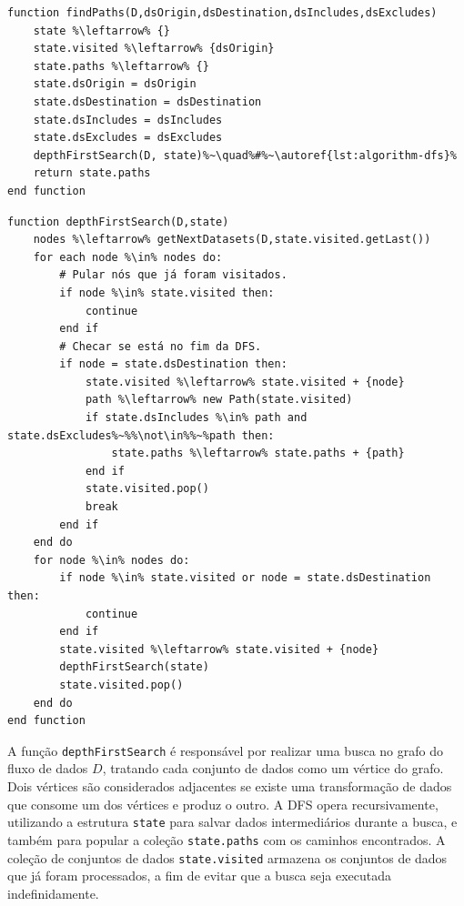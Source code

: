 \begin{minipage}[c]{0.95\textwidth}
\begin{lstlisting}[language=pseudocode,label={lst:algorithm-find-paths},caption={[Obtenção dos caminhos entre dois conjuntos de dados.]Obtenção de todos os caminhos entre dois conjuntos de dados, inicializando a \textsc{DFS} com um estado inicial apropriado.}]
function findPaths(D,dsOrigin,dsDestination,dsIncludes,dsExcludes)
    state %\leftarrow% {}
    state.visited %\leftarrow% {dsOrigin}
    state.paths %\leftarrow% {}
    state.dsOrigin = dsOrigin
    state.dsDestination = dsDestination
    state.dsIncludes = dsIncludes
    state.dsExcludes = dsExcludes
    depthFirstSearch(D, state)%~\quad%#%~\autoref{lst:algorithm-dfs}%
    return state.paths
end function
\end{lstlisting}
\end{minipage}

\begin{minipage}[c]{0.95\textwidth}
\begin{lstlisting}[language=pseudocode,label={lst:algorithm-dfs},caption={[Busca em Profundidade (DFS) dos caminhos]Depth First Search (DFS): busca em profundidade de todos os caminhos entre dois conjuntos de dados.}]
function depthFirstSearch(D,state)
    nodes %\leftarrow% getNextDatasets(D,state.visited.getLast())
    for each node %\in% nodes do:
        # Pular nós que já foram visitados.
        if node %\in% state.visited then:
            continue
        end if
        # Checar se está no fim da DFS.
        if node = state.dsDestination then:
            state.visited %\leftarrow% state.visited + {node}
            path %\leftarrow% new Path(state.visited)
            if state.dsIncludes %\in% path and state.dsExcludes%~%%\not\in%%~%path then:
                state.paths %\leftarrow% state.paths + {path}
            end if
            state.visited.pop()
            break
        end if
    end do
    for node %\in% nodes do:
        if node %\in% state.visited or node = state.dsDestination then:
            continue
        end if
        state.visited %\leftarrow% state.visited + {node}
        depthFirstSearch(state)
        state.visited.pop()
    end do
end function
\end{lstlisting}
\end{minipage}

A função \texttt{depthFirstSearch} é responsável por realizar uma busca no grafo do fluxo de dados \(D\), tratando cada conjunto de dados como um vértice do grafo. Dois vértices são considerados adjacentes se existe uma transformação de dados que consome um dos vértices e produz o outro. A DFS opera recursivamente, utilizando a estrutura \texttt{state} para salvar dados intermediários durante a busca, e também para popular a coleção \texttt{state.paths} com os caminhos encontrados. A coleção de conjuntos de dados \texttt{state.visited} armazena os conjuntos de dados que já foram processados, a fim de evitar que a busca seja executada indefinidamente.

